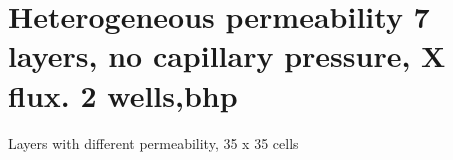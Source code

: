 \documentclass[a4paper,10pt]{report}
\begin{document}
% 
% 


\chapter*{Heterogeneous permeability 7 layers, no capillary pressure, X flux. 2 wells,bhp}
Layers with different permeability, 35 x 35 cells
\end{document}
